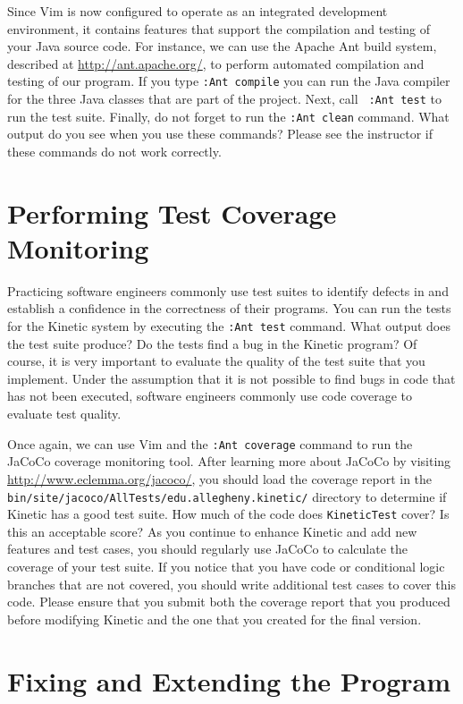 Since Vim is now configured to operate as an integrated development environment, it contains features that support
the compilation and testing of your Java source code.  For instance, we can use the Apache Ant build system, described
at \url{http://ant.apache.org/}, to perform automated compilation and testing of our program. If you type {\tt :Ant
	compile} you can run the Java compiler for the three Java classes that are part of the project.  Next, call {\tt
:Ant test} to run the test suite.  Finally, do not forget to run the {\tt :Ant clean} command. What output do you see
when you use these commands? Please see the instructor if these commands do not work correctly.

\section*{Performing Test Coverage Monitoring}

Practicing software engineers commonly use test suites to identify defects in and establish a confidence in the
correctness of their programs.  You can run the tests for the Kinetic system by executing the {\tt :Ant test} command.
What output does the test suite produce?  Do the tests find a bug in the Kinetic program?  Of course, it is very
important to evaluate the quality of the test suite that you implement.  Under the assumption that it is not possible to
find bugs in code that has not been executed, software engineers commonly use code coverage to evaluate test quality.  

Once again, we can use Vim and the {\tt :Ant coverage} command to run the JaCoCo coverage monitoring tool.  After
learning more about JaCoCo by visiting \url{http://www.eclemma.org/jacoco/}, you should load the coverage report in the
{\tt bin/site/jacoco/AllTests/edu.allegheny.kinetic/} directory to determine if Kinetic has a good test suite.
How much of the code does {\tt KineticTest} cover?  Is this an acceptable score?  As you continue to enhance Kinetic
and add new features and test cases, you should regularly use JaCoCo to calculate the coverage of your test
suite.  If you notice that you have code or conditional logic branches that are not covered, you should write additional
test cases to cover this code.  Please ensure that you submit both the coverage report that you produced before
modifying Kinetic and the one that you created for the final version.

\section*{Fixing and Extending the Program}

